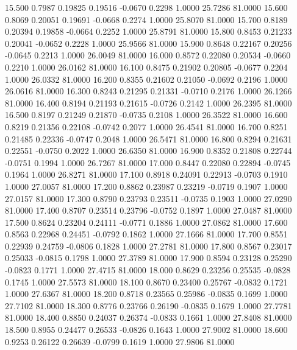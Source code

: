   15.500   0.7987   0.19825   0.19516  -0.0670   0.2298   1.0000  25.7286  81.0000
  15.600   0.8069   0.20051   0.19691  -0.0668   0.2274   1.0000  25.8070  81.0000
  15.700   0.8189   0.20394   0.19858  -0.0664   0.2252   1.0000  25.8791  81.0000
  15.800   0.8453   0.21233   0.20041  -0.0652   0.2228   1.0000  25.9566  81.0000
  15.900   0.8648   0.22167   0.20256  -0.0645   0.2213   1.0000  26.0049  81.0000
  16.000   0.8572   0.22080   0.20534  -0.0660   0.2210   1.0000  26.0162  81.0000
  16.100   0.8475   0.21902   0.20805  -0.0677   0.2204   1.0000  26.0332  81.0000
  16.200   0.8355   0.21602   0.21050  -0.0692   0.2196   1.0000  26.0616  81.0000
  16.300   0.8243   0.21295   0.21331  -0.0710   0.2176   1.0000  26.1266  81.0000
  16.400   0.8194   0.21193   0.21615  -0.0726   0.2142   1.0000  26.2395  81.0000
  16.500   0.8197   0.21249   0.21870  -0.0735   0.2108   1.0000  26.3522  81.0000
  16.600   0.8219   0.21356   0.22108  -0.0742   0.2077   1.0000  26.4541  81.0000
  16.700   0.8251   0.21485   0.22336  -0.0747   0.2048   1.0000  26.5471  81.0000
  16.800   0.8294   0.21631   0.22551  -0.0750   0.2022   1.0000  26.6350  81.0000
  16.900   0.8352   0.21808   0.22744  -0.0751   0.1994   1.0000  26.7267  81.0000
  17.000   0.8447   0.22080   0.22894  -0.0745   0.1964   1.0000  26.8271  81.0000
  17.100   0.8918   0.24091   0.22913  -0.0703   0.1910   1.0000  27.0057  81.0000
  17.200   0.8862   0.23987   0.23219  -0.0719   0.1907   1.0000  27.0157  81.0000
  17.300   0.8790   0.23793   0.23511  -0.0735   0.1903   1.0000  27.0290  81.0000
  17.400   0.8707   0.23514   0.23796  -0.0752   0.1897   1.0000  27.0487  81.0000
  17.500   0.8624   0.23204   0.24111  -0.0771   0.1886   1.0000  27.0862  81.0000
  17.600   0.8563   0.22968   0.24451  -0.0792   0.1862   1.0000  27.1666  81.0000
  17.700   0.8551   0.22939   0.24759  -0.0806   0.1828   1.0000  27.2781  81.0000
  17.800   0.8567   0.23017   0.25033  -0.0815   0.1798   1.0000  27.3789  81.0000
  17.900   0.8594   0.23128   0.25290  -0.0823   0.1771   1.0000  27.4715  81.0000
  18.000   0.8629   0.23256   0.25535  -0.0828   0.1745   1.0000  27.5573  81.0000
  18.100   0.8670   0.23400   0.25767  -0.0832   0.1721   1.0000  27.6367  81.0000
  18.200   0.8718   0.23565   0.25986  -0.0835   0.1699   1.0000  27.7102  81.0000
  18.300   0.8776   0.23766   0.26190  -0.0835   0.1679   1.0000  27.7781  81.0000
  18.400   0.8850   0.24037   0.26374  -0.0833   0.1661   1.0000  27.8408  81.0000
  18.500   0.8955   0.24477   0.26533  -0.0826   0.1643   1.0000  27.9002  81.0000
  18.600   0.9253   0.26122   0.26639  -0.0799   0.1619   1.0000  27.9806  81.0000
